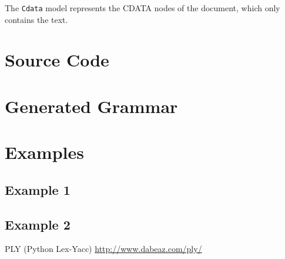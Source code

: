 \documentclass{article}
\begin{document}
The {\tt Cdata} model represents the CDATA nodes of the document, which only
contains the text.


\section{Source Code}




\section{Generated Grammar}




\section{Examples}

\subsection{Example 1}






\subsection{Example 2}












\begin{thebibliography}{}

 PLY (Python Lex-Yacc) \url{http://www.dabeaz.com/ply/}


\end{thebibliography}{}


\end{document}
